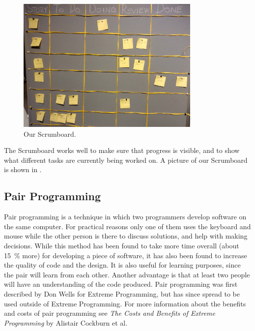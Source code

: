 \begin{description}
	\begin{figure}
	  \begin{center}
	    \includegraphics[width=0.80\textwidth]{figures/img/scrumboard_compressed.jpg}
	  \end{center}
	  \caption{Our Scrumboard.}
	  \label{fig:scrumboard}
	\end{figure}
	The Scrumboard works well to make sure that progress is visible, and to show what different tasks are currently being worked on.
	A picture of our Scrumboard is shown in .
\end{description}

\subsection{Pair Programming}\label{subsubsec:pairprogramming}
Pair programming is a technique in which two programmers develop software on the same computer.
For practical reasons only one of them uses the keyboard and mouse while the other person is there to discuss solutions, and help with making decisions.
While this method has been found to take more time overall (about 15~\% more) for developing a piece of software, it has also been found to increase the quality of code and the design.
It is also useful for learning purposes, since the pair will learn from each other.
Another advantage is that at least two people will have an understanding of the code produced.
Pair programming was first described by Don Wells for Extreme Programming\cite{pairAgile}, but has since spread to be used outside of Extreme Programming.
For more information about the benefits and costs of pair programming see \textit{The Costs and Benefits of Extreme Programming}\cite{cockburn2000costs} by Alistair Cockburn et al.

